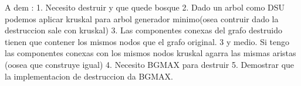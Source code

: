 A dem :
1. Necesito destruir y que quede bosque
2. Dado un arbol como DSU podemos aplicar kruskal para arbol generador minimo(osea contruir dado la destruccion sale con kruskal)
3. Las componentes conexas del grafo destruido tienen que contener los mismos nodos que el grafo original.
3 y medio. Si tengo las componentes conexas con los mismos nodos kruskal agarra las mismas aristas (oosea que construye igual)
4. Necesito BGMAX para destruir
5. Demostrar que la implementacion de destruccion da BGMAX.
